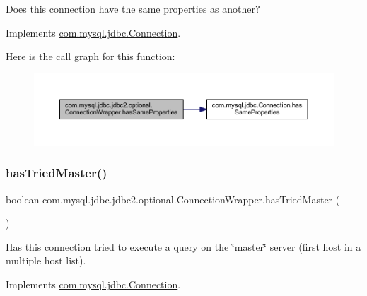 Does this connection have the same properties as another? 

Implements \mbox{\hyperlink{interfacecom_1_1mysql_1_1jdbc_1_1_connection_aa075b035aedfaf2d59114dde53cfc3de}{com.\+mysql.\+jdbc.\+Connection}}.

Here is the call graph for this function\+:
\nopagebreak
\begin{figure}[H]
\begin{center}
\leavevmode
\includegraphics[width=350pt]{classcom_1_1mysql_1_1jdbc_1_1jdbc2_1_1optional_1_1_connection_wrapper_a374522991d8d1ed955de5defd526a59d_cgraph}
\end{center}
\end{figure}
\mbox{\label{classcom_1_1mysql_1_1jdbc_1_1jdbc2_1_1optional_1_1_connection_wrapper_a81b35d775907ec47cd7d3b1007700939}} 
\subsubsection{\texorpdfstring{has\+Tried\+Master()}{hasTriedMaster()}}
{\footnotesize\ttfamily boolean com.\+mysql.\+jdbc.\+jdbc2.\+optional.\+Connection\+Wrapper.\+has\+Tried\+Master (\begin{DoxyParamCaption}{ }\end{DoxyParamCaption})}

Has this connection tried to execute a query on the \char`\"{}master\char`\"{} server (first host in a multiple host list). 

Implements \mbox{\hyperlink{interfacecom_1_1mysql_1_1jdbc_1_1_connection_a2bc23d62512f6dfaac0566369a0125df}{com.\+mysql.\+jdbc.\+Connection}}.

